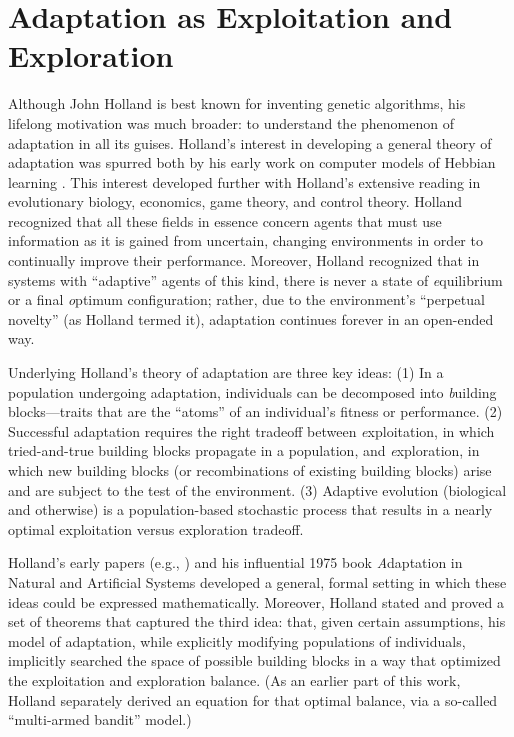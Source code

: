 \documentclass{sig-alternate}
\begin{document}
\section{Adaptation as Exploitation and Exploration}

Although John Holland is best known for inventing genetic algorithms, his
lifelong motivation was much broader: to understand the
phenomenon of adaptation in all its guises.  Holland's interest in
developing a general theory of adaptation was spurred both by his
early work on computer models of Hebbian learning
\cite{RochesterHolland}.  This interest developed further with
Holland's extensive reading in evolutionary biology, economics, game
theory, and control theory.  Holland recognized that all these fields
in essence concern agents that must use information as it is gained from
uncertain, changing environments in order to continually improve their
performance.  Moreover, Holland recognized that in systems with
``adaptive'' agents of this kind, there is never a state of {\emph
  equilibrium} or a final {\emph optimum} configuration; rather, due
to the environment's ``perpetual novelty'' (as Holland termed it),
adaptation continues forever in an open-ended way.

Underlying Holland's theory of adaptation are three key ideas: (1) In
a population undergoing adaptation, individuals can be decomposed into
{\emph building blocks}---traits that are the ``atoms'' of an
individual's fitness or performance.  (2) Successful adaptation
requires the right tradeoff between {\emph exploitation}, in which
tried-and-true building blocks propagate in a population, and {\emph
  exploration}, in which new building blocks (or recombinations of
existing building blocks) arise and are subject to the test of the
environment. (3) Adaptive evolution (biological and otherwise) is a
population-based stochastic process that results in a nearly optimal
exploitation versus exploration tradeoff.   

Holland's early papers (e.g.,
\cite{OutlineLogicalTheory,OptimalAllocation}) and his influential
1975 book {\emph Adaptation in Natural and Artificial Systems}
\cite{ANAS} developed a general, formal setting in which these ideas
could be expressed mathematically.  Moreover, Holland stated and
proved a set of theorems that captured the third idea: that, given certain
assumptions, his model of adaptation, while explicitly modifying
populations of individuals, implicitly searched the space of possible
building blocks in a way that optimized the exploitation and
exploration balance.  (As an earlier part of this work, Holland
separately derived an equation for that optimal balance, via a
so-called ``multi-armed bandit'' model.)    
\end{document}
